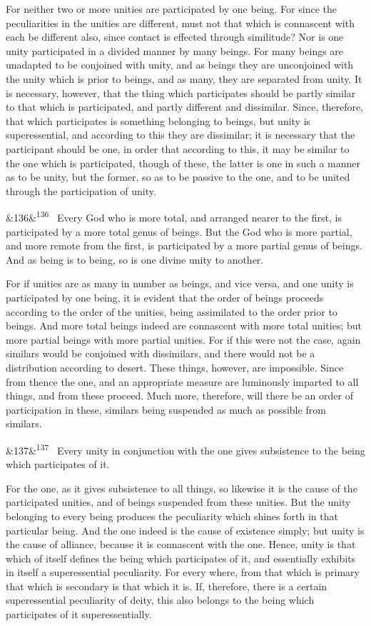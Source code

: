 \documentclass[12pt]{article}
\newcommand{\para}[1][]{\par\noindent\ifx&#1&\else\textsuperscript{\footnotesize #1}~\fi}
\begin{document}
For neither two or more unities are participated by one being. For since the peculiarities in the unities are different, must not that which is connascent with each be different also, since contact is effected through similitude? Nor is one unity participated in a divided manner by many beings. For many beings are unadapted to be conjoined with unity, and as beings they are unconjoined with the unity which is prior to beings, and as many, they are separated from unity. It is necessary, however, that the thing which participates should be partly similar to that which is participated, and partly different and dissimilar. Since, therefore, that which participates is something belonging to beings, but unity is superessential, and according to this they are dissimilar; it is necessary that the participant should be one, in order that according to this, it may be similar to the one which is participated, though of these, the latter is one in such a manner as to be unity, but the former, so as to be passive to the one, and to be united through the participation of unity.

\para[136] Every God who is more total, and arranged nearer to the first, is participated by a more total genus of beings. But the God who is more partial, and more remote from the first, is participated by a more partial genus of beings. And as being is to being, so is one divine unity to another.

For if unities are as many in number as beings, and vice versa, and one unity is participated by one being, it is evident that the order of beings proceeds according to the order of the unities, being assimilated to the order prior to beings. And more total beings indeed are connascent with more total unities; but more partial beings with more partial unities. For if this were not the case, again similars would be conjoined with dissimilars, and there would not be a distribution according to desert. These things, however, are impossible. Since from thence the one, and an appropriate measure are luminously imparted to all things, and from these proceed. Much more, therefore, will there be an order of participation in these, similars being suspended as much as possible from similars.

\para[137] Every unity in conjunction with the one gives subsistence to the being which participates of it.

For the one, as it gives subsistence to all things, so likewise it is the cause of the participated unities, and of beings suspended from these unities. But the unity belonging to every being produces the peculiarity which shines forth in that particular being. And the one indeed is the cause of existence simply; but unity is the cause of alliance, because it is connascent with the one. Hence, unity is that which of itself defines the being which participates of it, and essentially exhibits in itself a superessential peculiarity. For every where, from that which is primary that which is secondary is that which it is. If, therefore, there is a certain superessential peculiarity of deity, this also belongs to the being which participates of it superessentially.
\end{document}
